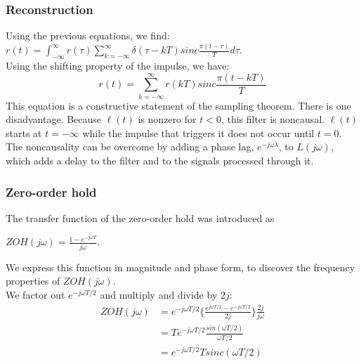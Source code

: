 \begin{frame}
	\frametitle{Reconstruction}
	Using the previous equations, we find:\\
	\medskip
	$r(t)=\int_{-\infty}^{\infty} r(\tau)\sum_{k=-\infty}^{\infty} \delta(\tau-kT)sinc\frac{\pi(t-\tau)}{T}d\tau$.\\
	\medskip
	Using the shifting property of the impulse, we have:\\
	 \[
	 \boxed{r(t)=\sum_{k=-\infty}^{\infty} r(kT)sinc\frac{\pi(t-kT)}{T}}
	 \]
	This equation is a constructive statement of the sampling theorem.  There is one disadvantage. Because $\ell(t)$ is nonzero for $t < 0$, this filter is noncausal. $\ell(t)$ starts at $t=-\infty$ while the impulse that triggers it does not occur until $t=0$. The noncausality can be overcome by adding a phase lag, $e^{-j\omega \lambda}$, to $L(j\omega)$, which adds a delay to the filter and to the signals processed through it.
\end{frame}

\begin{frame}
	\frametitle{Zero-order hold}
	The transfer function of the zero-order hold was introduced as\\
	\vspace{-1ex}
	\begin{center}
		$ZOH(j\omega)=\frac{1-e^{-j\omega T}}{j\omega}$.\\
	\end{center}
	\vspace{-1ex}
	We express this function in magnitude and phase form, to discover the frequency properties of $ZOH(j\omega)$.\\
	\medskip
	We factor out $e^{-j\omega T/2}$ and multiply and divide by $2j$:\\
	\vspace{-4ex}
	\begin{equation}
	\begin{split}
		ZOH(j\omega) &= e^{-j\omega T/2}\Big\{\frac{e^{j\omega T/2}-e^{-j\omega T/2}}{2j}\Big\} \frac{2j}{j\omega}\\
		& = Te^{-j\omega T/2} \frac{sin(\omega T/2)}{\omega T/2}\\
		& = e^{-j\omega T/2} T sinc(\omega T/2)
	\end{split} \nonumber
	\end{equation}
	\vspace{-1ex}
\end{frame}

